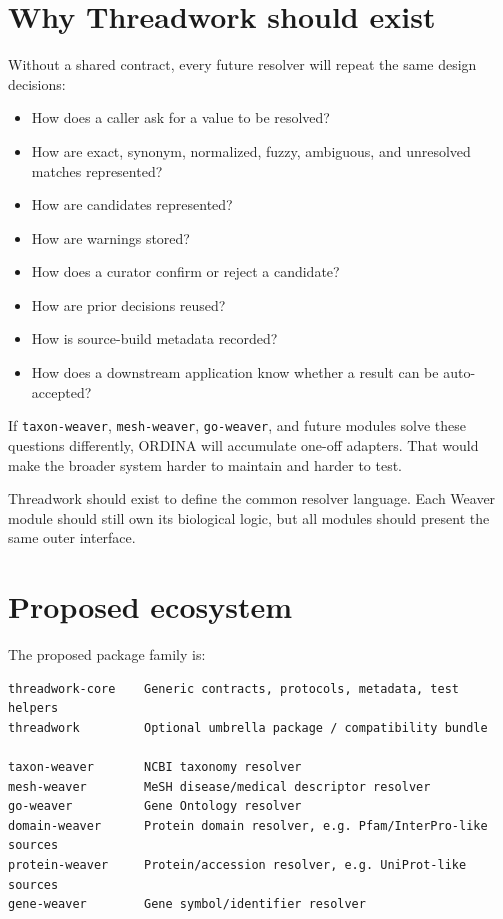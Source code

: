 \documentclass[11pt,a4paper]{article}
\newcommand{\code}[1]{\texttt{#1}}
\begin{document}
\section{Why Threadwork should exist}

Without a shared contract, every future resolver will repeat the same design decisions:

\begin{itemize}
  \item How does a caller ask for a value to be resolved?
  \item How are exact, synonym, normalized, fuzzy, ambiguous, and unresolved matches represented?
  \item How are candidates represented?
  \item How are warnings stored?
  \item How does a curator confirm or reject a candidate?
  \item How are prior decisions reused?
  \item How is source-build metadata recorded?
  \item How does a downstream application know whether a result can be auto-accepted?
\end{itemize}

If \code{taxon-weaver}, \code{mesh-weaver}, \code{go-weaver}, and future modules solve these questions differently, ORDINA will accumulate one-off adapters. That would make the broader system harder to maintain and harder to test.

Threadwork should exist to define the common resolver language. Each Weaver module should still own its biological logic, but all modules should present the same outer interface.

\section{Proposed ecosystem}

The proposed package family is:

\begin{Verbatim}[fontsize=\small]
threadwork-core    Generic contracts, protocols, metadata, test helpers
threadwork         Optional umbrella package / compatibility bundle

taxon-weaver       NCBI taxonomy resolver
mesh-weaver        MeSH disease/medical descriptor resolver
go-weaver          Gene Ontology resolver
domain-weaver      Protein domain resolver, e.g. Pfam/InterPro-like sources
protein-weaver     Protein/accession resolver, e.g. UniProt-like sources
gene-weaver        Gene symbol/identifier resolver
\end{Verbatim}
\end{document}
